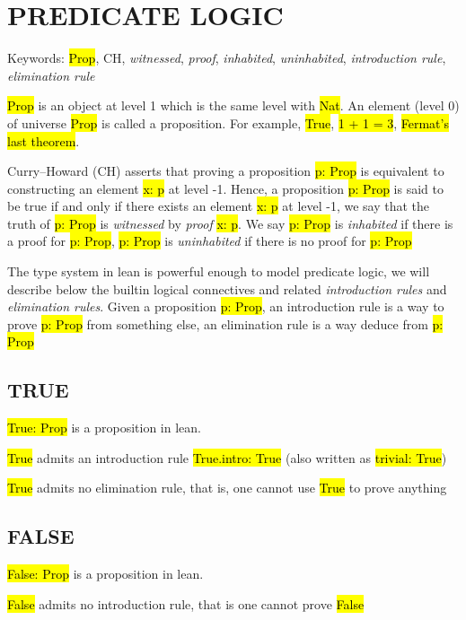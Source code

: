\chapter{PREDICATE LOGIC}

Keywords: \hl{Prop}, CH, \textit{witnessed}, \textit{proof}, \textit{inhabited}, \textit{uninhabited}, \textit{introduction rule}, \textit{elimination rule}

\hl{Prop} is an object at level 1 which is the same level with \hl{Nat}. An element (level 0) of universe \hl{Prop} is called a proposition. For example, \hl{True}, \hl{1 + 1 = 3}, \hl{Fermat's last theorem}.

Curry–Howard (CH) \cite{CH} asserts that proving a proposition \hl{p: Prop} is equivalent to constructing an element \hl{x: p} at level -1. Hence, a proposition \hl{p: Prop} is said to be true if and only if there exists an element  \hl{x: p} at level -1, we say that the truth of \hl{p: Prop} is \textit{witnessed} by \textit{proof} \hl{x: p}. We say \hl{p: Prop} is \textit{inhabited} if there is a proof for \hl{p: Prop}, \hl{p: Prop} is \textit{uninhabited} if there is no proof for \hl{p: Prop}

The type system in lean is powerful enough to model predicate logic, we will describe below the builtin logical connectives and related \textit{introduction rules} and \textit{elimination rules}. Given a proposition \hl{p: Prop}, an introduction rule is a way to prove \hl{p: Prop} from something else, an elimination rule is a way deduce from \hl{p: Prop}

\section{TRUE}

\hl{True: Prop} is a proposition in lean.

\hl{True} admits an introduction rule \hl{True.intro: True} (also written as \hl{trivial: True})

\hl{True} admits no elimination rule, that is, one cannot use \hl{True} to prove anything

\section{FALSE}

\hl{False: Prop} is a proposition in lean.

\hl{False} admits no introduction rule, that is one cannot prove \hl{False}

